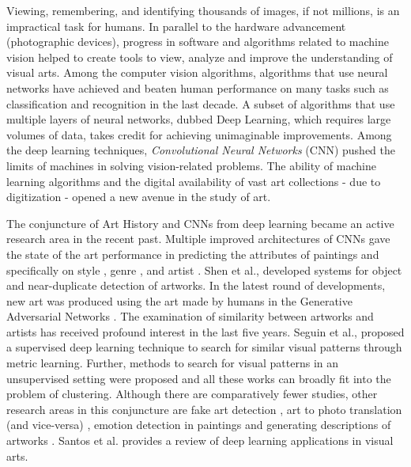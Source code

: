 Viewing, remembering, and identifying thousands of images, if not millions, is an impractical task for humans. In parallel to the hardware advancement (photographic devices), progress in software and algorithms related to machine vision helped to create tools to view, analyze and improve the understanding of visual arts. Among the computer vision algorithms, algorithms that use neural networks have achieved and beaten human performance on many tasks such as classification and recognition in the last decade. A subset of algorithms that use multiple layers of neural networks, dubbed Deep Learning, which requires large volumes of data, takes credit for achieving unimaginable improvements. Among the deep learning techniques, \emph{Convolutional Neural Networks} (CNN) pushed the limits of machines in solving vision-related problems. The ability of machine learning algorithms and the digital availability of vast art collections - due to digitization - opened a new avenue in the study of art.

The conjuncture of Art History and CNNs from deep learning became an active research area in the recent past. Multiple improved architectures of CNNs gave the state of the art performance in predicting the attributes of paintings \cite{saleh_2016, tan_2016} and specifically on style \cite{karayev_2014}, genre \cite{cetinic_2018}, and artist \cite{van_2015}. Shen et al., \cite{Shen2019DiscoveringVP} developed systems for object and near-duplicate detection of artworks. In the latest round of developments, new art was produced \cite{Elgammal2017CANCA, Tan2019ImprovedAF} using the art made by humans in the Generative Adversarial Networks \cite{Ian2014_GAN}. The examination of similarity between artworks and artists has received profound interest in the last five years. Seguin et al., \cite{seguin_2016} proposed a supervised deep learning technique to search for similar visual patterns through metric learning. Further, methods to search for visual patterns in an unsupervised setting were proposed \cite{gultepe_2018, Castellano2021VisualLR} and all these works can broadly fit into the problem of clustering. Although there are comparatively fewer studies, other research areas in this conjuncture are fake art detection \cite{elgammal_2018}, art to photo translation (and vice-versa) \cite{Tomei2019Art2RealUT, matteo_2019}, emotion detection in paintings \cite{HE_wei_2018} and generating descriptions of artworks \cite{noa_2019}. Santos et al. \cite{Santos2021ArtificialNN} provides a review of deep learning applications in visual arts.

